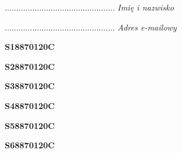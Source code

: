 \begin{turn}{90}\begin{minipage}{\linewidth} \vspace{20mm} ................................................  \textit{Imię i nazwisko}\end{minipage}\end{turn}

\begin{turn}{90}\begin{minipage}{\linewidth} \vspace{20mm} ................................................  \textit{Adres e-mailowy}\end{minipage}\end{turn}

\begin{turn}{90}\huge \begin{minipage}{\linewidth} \vspace{10mm}\textbf{S18870120C}\end{minipage}\end{turn}

\begin{turn}{90}\huge \begin{minipage}{\linewidth} \vspace{10mm}\textbf{S28870120C}\end{minipage}\end{turn}

\begin{turn}{90}\huge \begin{minipage}{\linewidth} \vspace{10mm}\textbf{S38870120C}\end{minipage}\end{turn}

\begin{turn}{90}\huge \begin{minipage}{\linewidth} \vspace{10mm}\textbf{S48870120C}\end{minipage}\end{turn}

\begin{turn}{90}\huge \begin{minipage}{\linewidth} \vspace{10mm}\textbf{S58870120C}\end{minipage}\end{turn}

\begin{turn}{90}\huge \begin{minipage}{\linewidth} \vspace{10mm}\textbf{S68870120C}\end{minipage}\end{turn}

